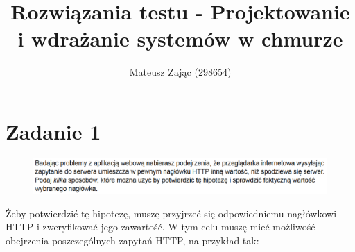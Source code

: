 \documentclass{article}
\title{Rozwiązania testu - Projektowanie i wdrażanie systemów w chmurze}
\author{Mateusz Zając (298654)}
\begin{document}
	\maketitle
	\section*{Zadanie 1}
		\begin{figure}[h!]
			\includegraphics[width=1\textwidth]{za1}
		\end{figure}
		Żeby potwierdzić tę hipotezę, muszę przyjrzeć się odpowiedniemu nagłówkowi HTTP i zweryfikować jego zawartość. W tym celu muszę mieć możliwość obejrzenia poszczególnych zapytań HTTP, na przykład tak:
\end{document}
